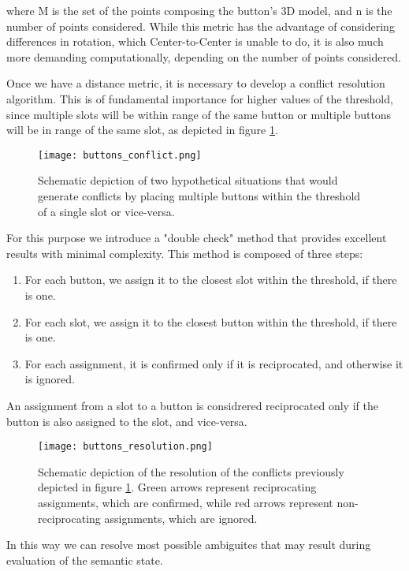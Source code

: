 where M is the set of the points composing the button's 3D model, and n is the number of points considered. While this metric has the advantage of considering differences in rotation, which Center-to-Center is unable to do, it is also much more demanding computationally, depending on the number of points considered.

Once we have a distance metric, it is necessary to develop a conflict resolution algorithm. This is of fundamental importance for higher values of the threshold, since multiple slots will be within range of the same button or multiple buttons will be in range of the same slot, as depicted in figure \ref{fig:conflicts}.

\begin{figure}[ht]
    \texttt{[image: buttons\_conflict.png]}
    \caption{Schematic depiction of two hypothetical situations that would generate conflicts by placing multiple buttons within the threshold of a single slot or vice-versa.}
    \label{fig:conflicts}
\end{figure}

For this purpose we introduce a "double check" method that provides excellent results with minimal complexity. This method is composed of three steps:

\begin{enumerate}
    \item For each button, we assign it to the closest slot within the threshold, if there is one.
    \item For each slot, we assign it to the closest button within the threshold, if there is one.
    \item For each assignment, it is confirmed only if it is reciprocated, and otherwise it is ignored.
\end{enumerate}

An assignment from a slot to a button is considrered reciprocated only if the button is also assigned to the slot, and vice-versa.

\begin{figure}[ht]
    \texttt{[image: buttons\_resolution.png]}
    \caption{Schematic depiction of the resolution of the conflicts previously depicted in figure \ref{fig:conflicts}. Green arrows represent reciprocating assignments, which are confirmed, while red arrows represent non-reciprocating assignments, which are ignored.}
    \label{fig:resolution}
\end{figure}

In this way we can resolve most possible ambiguites that may result during evaluation of the semantic state.


